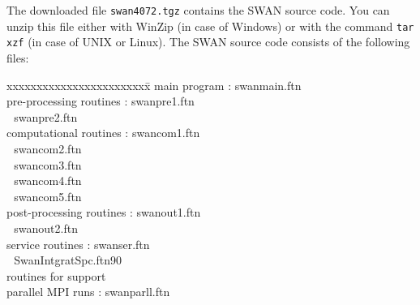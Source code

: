 \documentclass[12pt]{book}
\begin{document}
The downloaded file {\tt swan4072.tgz} contains the SWAN source code. You can unzip this
file either with WinZip (in case of Windows) or with the command {\tt tar xzf} (in case of
UNIX or Linux). The SWAN source code consists of the following files:
\begin{tabbing}
xxxxxxxxxxxxxxxxxxxxxxxx\= \kill
main program             \>:       swanmain.ftn \\
pre-processing routines  \>:       swanpre1.ftn \\
                         \> $\,\,$ swanpre2.ftn \\
computational routines   \>:       swancom1.ftn \\
                         \> $\,\,$ swancom2.ftn \\
                         \> $\,\,$ swancom3.ftn \\
                         \> $\,\,$ swancom4.ftn \\
                         \> $\,\,$ swancom5.ftn \\
post-processing routines \>:       swanout1.ftn \\
                         \> $\,\,$ swanout2.ftn \\
service routines         \>:       swanser.ftn \\
                         \> $\,\,$ SwanIntgratSpc.ftn90 \\
routines for support     \> \\
parallel MPI runs        \>:       swanparll.ftn \\
\end{tabbing}
\newpage
\end{document}
